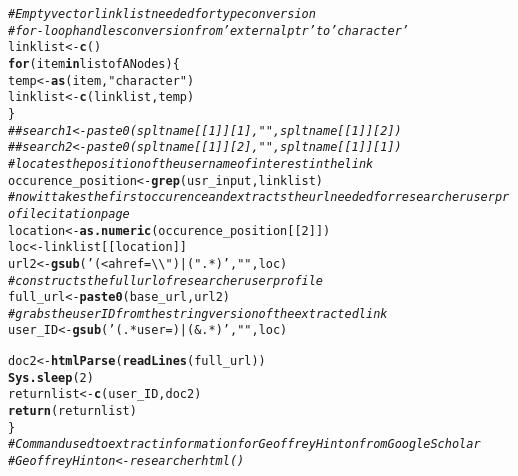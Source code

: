 \documentclass{article}\usepackage[]{graphicx}\usepackage[]{color}
\makeatletter
\newcommand{\hlnum}[1]{\textcolor[rgb]{0.686,0.059,0.569}{#1}}%
\newcommand{\hlstr}[1]{\textcolor[rgb]{0.192,0.494,0.8}{#1}}%
\newcommand{\hlcom}[1]{\textcolor[rgb]{0.678,0.584,0.686}{\textit{#1}}}%
\newcommand{\hlstd}[1]{\textcolor[rgb]{0.345,0.345,0.345}{#1}}%
\newcommand{\hlkwa}[1]{\textcolor[rgb]{0.161,0.373,0.58}{\textbf{#1}}}%
\newcommand{\hlkwb}[1]{\textcolor[rgb]{0.69,0.353,0.396}{#1}}%
\newcommand{\hlkwd}[1]{\textcolor[rgb]{0.737,0.353,0.396}{\textbf{#1}}}%
\newenvironment{kframe}{%
 \def\at@end@of@kframe{}%
 \ifinner\ifhmode%
  \def\at@end@of@kframe{\end{minipage}}%
  \begin{minipage}{\columnwidth}%
 \fi\fi%
 \def\FrameCommand##1{\hskip\@totalleftmargin \hskip-\fboxsep
 \colorbox{shadecolor}{##1}\hskip-\fboxsep
     \hskip-\linewidth \hskip-\@totalleftmargin \hskip\columnwidth}%
 \MakeFramed {\advance\hsize-\width
   \@totalleftmargin\z@ \linewidth\hsize
   \@setminipage}}%
 {\par\unskip\endMakeFramed%
 \at@end@of@kframe}
\newenvironment{knitrout}{}{} %
\makeatother
\begin{document}
\begin{knitrout}
\begin{kframe}
\begin{alltt}
  \hlcom{#Empty vector linklist needed for type conversion}
  \hlcom{#for-loop handles conversion from 'externalptr' to 'character'}
  \hlstd{linklist}\hlkwb{<-}\hlkwd{c}\hlstd{()}
  \hlkwa{for} \hlstd{(item} \hlkwa{in} \hlstd{listofANodes) \{}
    \hlstd{temp}\hlkwb{<-}\hlkwd{as}\hlstd{(item,} \hlstr{"character"}\hlstd{)}
    \hlstd{linklist}\hlkwb{<-}\hlkwd{c}\hlstd{(linklist, temp)}
  \hlstd{\}}
  \hlcom{##search1<-paste0(spltname[[1]][1]," ",spltname[[1]][2])}
  \hlcom{##search2<-paste0(spltname[[1]][2]," ",spltname[[1]][1])}
  \hlcom{#locates the position of the user name of interest in the link}
  \hlstd{occurence_position}\hlkwb{<-}\hlkwd{grep}\hlstd{(usr_input, linklist)}
  \hlcom{#now it takes the first occurence and extracts the url needed for researcher user profile citation page}
  \hlstd{location}\hlkwb{<-}\hlkwd{as.numeric}\hlstd{(occurence_position[[}\hlnum{2}\hlstd{]])}
  \hlstd{loc}\hlkwb{<-}\hlstd{linklist[[location]]}
  \hlstd{url2}\hlkwb{<-}\hlkwd{gsub}\hlstd{(}\hlstr{'(<a href=\textbackslash{}\textbackslash{}")|(".*)'}\hlstd{,}\hlstr{""}\hlstd{,loc)}
  \hlcom{#constructs the full url of researcher user profile}
  \hlstd{full_url}\hlkwb{<-}\hlkwd{paste0}\hlstd{(base_url,url2)}
  \hlcom{#grabs the user ID from the string version of the extracted link}
  \hlstd{user_ID}\hlkwb{<-}\hlkwd{gsub}\hlstd{(}\hlstr{'(.*user=)|(&.*)'}\hlstd{,}\hlstr{""}\hlstd{,loc)}

  \hlstd{doc2}\hlkwb{<-}\hlkwd{htmlParse}\hlstd{(}\hlkwd{readLines}\hlstd{(full_url))}
  \hlkwd{Sys.sleep}\hlstd{(}\hlnum{2}\hlstd{)}
  \hlstd{returnlist}\hlkwb{<-}\hlkwd{c}\hlstd{(user_ID, doc2)}
  \hlkwd{return}\hlstd{(returnlist)}
\hlstd{\}}
\hlcom{#Command used to extract information for Geoffrey Hinton from Google Scholar}
\hlcom{#GeoffreyHinton<-researcherhtml()}
\end{alltt}
\end{kframe}
\end{knitrout}
\end{document}
